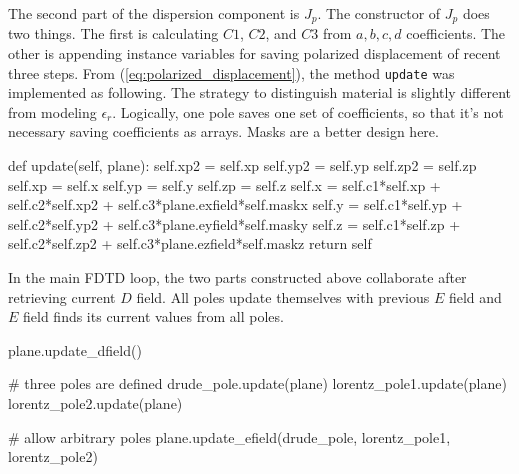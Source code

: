 The second part of the dispersion component is $J_p$. The constructor of $J_p$ does two things. The first is calculating
$C1$, $C2$, and $C3$ from $a,b,c,d$ coefficients. The other is appending instance variables for saving polarized
displacement of recent three steps. From (\ref{eq:polarized_displacement}), the method \texttt{update} was implemented
as following. The strategy to distinguish material is slightly different from modeling $\epsilon_r$. Logically, one pole
saves one set of coefficients, so that it's not necessary saving coefficients as arrays. Masks are a better design here.
\begin{code}
    def update(self, plane):
        self.xp2 = self.xp
        self.yp2 = self.yp
        self.zp2 = self.zp
        self.xp = self.x
        self.yp = self.y
        self.zp = self.z
        self.x = self.c1*self.xp + self.c2*self.xp2 + self.c3*plane.exfield*self.maskx
        self.y = self.c1*self.yp + self.c2*self.yp2 + self.c3*plane.eyfield*self.masky
        self.z = self.c1*self.zp + self.c2*self.zp2 + self.c3*plane.ezfield*self.maskz
        return self
\end{code}
In the main FDTD loop, the two parts constructed above collaborate after retrieving current $D$ field. All poles update
themselves with previous $E$ field and $E$ field finds its current values from all poles.
\begin{code}
  plane.update_dfield()

  # three poles are defined 
  drude_pole.update(plane)
  lorentz_pole1.update(plane)
  lorentz_pole2.update(plane)

  # allow arbitrary poles 
  plane.update_efield(drude_pole, lorentz_pole1, lorentz_pole2) 
\end{code}
